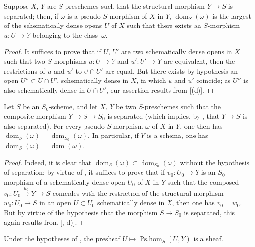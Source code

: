 \begin{proposition}[20.2.4]
\label{IV.20.2.4}
Suppose $X$, $Y$ are $S$-preschemes such that the structural morphism $Y\to S$ is separated;
then, if $\omega$ is a pseudo-$S$-morphism of $X$ in $Y$, $\operatorname{dom}_S(\omega)$ is the largest of the schematically dense opens $U$ of $X$ such that there exists an $S$-morphism $u:U\to Y$ belonging to the class~$\omega$.
\end{proposition}

\begin{proof}
It suffices to prove that if $U$, $U'$ are two schematically dense opens in $X$ such that two $S$-morphisms $u:U\to Y$ and $u':U'\to Y$ are equivalent, then the restrictions of $u$ and $u'$ to $U\cap U'$ are equal.
But there exists by hypothesis an open $U''\subset U\cap U'$, schematically dense in $X$, in which $u$ and $u'$ coincide;
as $U''$ is also schematically dense in $U\cap U'$, our assertion results from [(d)].
\end{proof}

\begin{corollary}[20.2.5]
\label{IV.20.2.5}
Let $S$ be an $S_0$-scheme, and let $X$, $Y$ be two $S$-preschemes such that the composite morphism $Y\to S\to S_0$ is separated (which implies, by , that $Y\to S$ is also separated).
For every pseudo-$S$-morphism $\omega$ of $X$ in $Y$, one then has $\operatorname{dom}_S(\omega)=\operatorname{dom}_{S_0}(\omega)$.
In particular, if $Y$ is a schema, one has $\operatorname{dom}_S(\omega)=\operatorname{dom}(\omega)$.
\end{corollary}

\begin{proof}
Indeed, it is clear that $\operatorname{dom}_S(\omega)\subset\operatorname{dom}_{S_0}(\omega)$ without the hypothesis of separation;
by virtue of , it suffices to prove that if $u_0:U_0\to Y$ is an $S_0$-morphism of a
schematically dense open $U_0$ of $X$ in $Y$ such that the composed $v_0:U_0\xrightarrow{u_0}Y\to S$ coincides with the restriction of the structural morphism $w_0:U_0\to S$ in an open $U\subset U_0$ schematically dense in $X$, then one has $v_0=w_0$.
But by virtue of the hypothesis that the morphism $S\to S_0$ is separated, this again results from [, d)].
\end{proof}

\begin{corollary}[20.2.6]
\label{IV.20.2.6}
Under the hypotheses of , the presheaf $U\mapsto\operatorname{Ps.hom}_S(U,Y)$ is a sheaf.
\end{corollary}

